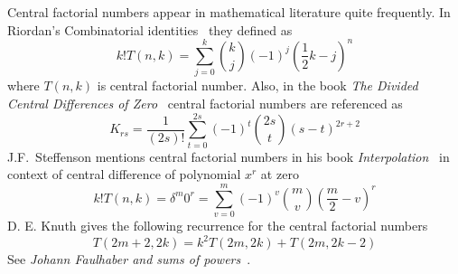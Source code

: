Central factorial numbers appear in mathematical literature quite frequently.
In Riordan's Combinatorial identities~\cite[p. 217]{riordan1968combinatorial} they defined as
\begin{equation}
    k! T(n,k) = \sum_{j=0}^{k} \binom{k}{j} (-1)^{j} \left( \frac{1}{2}k - j \right)^{n}
    \label{eq:cfn-riordan}
\end{equation}
where $T(n,k)$ is central factorial number.
Also, in the book \textit{The Divided Central Differences of Zero}~\cite[eq. (10a)]{carlitz_riordan_1963}
central factorial numbers are referenced as
\begin{equation*}
    K_{rs} = \frac{1}{(2s)!} \sum_{t=0}^{2s} (-1)^t \binom{2s}{t} (s-t)^{2r+2}
\end{equation*}
J.F.\ Steffenson mentions central factorial numbers in his book
\textit{Interpolation}~\cite{steffensen1927interpolation}
in context of central difference of polynomial $x^r$ at zero
\begin{equation*}
    k! T(n,k) = \delta^m 0^r = \sum_{v=0}^{m} (-1)^v \binom{m}{v} \left( \frac{m}{2} - v \right)^r
\end{equation*}
D. E. Knuth gives the following recurrence for the central factorial numbers
\begin{equation*}
    T(2m+2, 2k) = k^2 T(2m,2k) + T(2m, 2k - 2)
\end{equation*}
See \textit{Johann Faulhaber and sums of powers}~\cite[p. 284]{knuth1993johann}.

